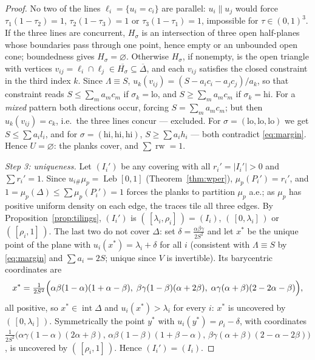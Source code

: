 \documentclass[11pt,reqno]{amsart}
\theoremstyle{plain}
\theoremstyle{definition}
\theoremstyle{remark}
\newcommand{\rw}{\operatorname{rw}}
\newcommand{\Leb}{\operatorname{Leb}}
\begin{document}
\begin{proof}
No two of the lines $\ell_i=\{u_i=c_i\}$ are parallel: $u_i\parallel u_j$ would
force $\tau_1(1-\tau_2)=1$, $\tau_2(1-\tau_3)=1$ or $\tau_3(1-\tau_1)=1$,
impossible for $\tau\in(0,1)^3$. If the three lines are concurrent, $H_\sigma$
is an intersection of three open half-planes whose boundaries pass through one
point, hence empty or an unbounded open cone; boundedness gives
$H_\sigma=\varnothing$. Otherwise $H_\sigma$, if nonempty, is the open triangle
with vertices $v_{ij}=\ell_i\cap\ell_j\in\overline{H_\sigma}
\subseteq\overline\Delta$, and each $v_{ij}$ satisfies the closed constraint in
the third index $k$. Since $\Lambda\equiv S$,
$u_k(v_{ij})=(S-a_ic_i-a_jc_j)/a_k$, so that constraint reads $S\le\sum_ma_mc_m$
if $\sigma_k=\mathrm{lo}$, and $S\ge\sum_ma_mc_m$ if $\sigma_k=\mathrm{hi}$. For
a \emph{mixed} pattern both directions occur, forcing $S=\sum_ma_mc_m$; but then
$u_k(v_{ij})=c_k$, i.e.\ the three lines concur --- excluded. For
$\sigma=(\mathrm{lo},\mathrm{lo},\mathrm{lo})$ we get $S\le\sum a_il_i$, and for
$\sigma=(\mathrm{hi},\mathrm{hi},\mathrm{hi})$, $S\ge\sum a_ih_i$ --- both
contradict \eqref{eq:margin}. Hence $U=\varnothing$: the planks cover, and
$\sum\rw=1$.

\emph{Step 3: uniqueness.} Let $(I_i')$ be any covering with all
$r_i'=|I_i'|>0$ and $\sum r_i'=1$. Since $u_{i\#}\mu_p=\Leb[0,1]$
(Theorem~\ref{thm:wper}), $\mu_p(P_i')=r_i'$, and
$1=\mu_p(\Delta)\le\sum\mu_p(P_i')=1$ forces the planks to partition $\mu_p$
a.e.; as $\mu_p$ has positive uniform density on each edge, the traces tile all
three edges. By Proposition~\ref{prop:tilings}, $(I_i')$ is $(\,[\lambda_i,
\rho_i]\,)=(I_i)$, $(\,[0,\lambda_i]\,)$ or $(\,[\rho_i,1]\,)$. The last two do
not cover $\Delta$: set $\delta=\frac{\alpha\beta\gamma}{2S^2}$ and let
$x^\ast$ be the unique point of the plane with $u_i(x^\ast)=\lambda_i+\delta$
for all $i$ (consistent with $\Lambda\equiv S$ by \eqref{eq:margin} and
$\sum a_i=2S$; unique since $V$ is invertible). Its barycentric coordinates are
\[
x^\ast=\tfrac1{2S^2}\Bigl(\alpha\beta(1-\alpha)(1+\alpha-\beta),\;
\beta\gamma(1-\beta)(\alpha+2\beta),\;
\alpha\gamma(\alpha+\beta)(2-2\alpha-\beta)\Bigr),
\]
all positive, so $x^\ast\in\operatorname{int}\Delta$ and
$u_i(x^\ast)>\lambda_i$ for every $i$: $x^\ast$ is uncovered by
$(\,[0,\lambda_i]\,)$. Symmetrically the point $y^\ast$ with
$u_i(y^\ast)=\rho_i-\delta$, with coordinates
$\frac1{2S^2}\bigl(\alpha\gamma(1-\alpha)(2\alpha+\beta),\,
\alpha\beta(1-\beta)(1+\beta-\alpha),\,
\beta\gamma(\alpha+\beta)(2-\alpha-2\beta)\bigr)$, is uncovered by
$(\,[\rho_i,1]\,)$. Hence $(I_i')=(I_i)$.
\end{proof}
\end{document}

